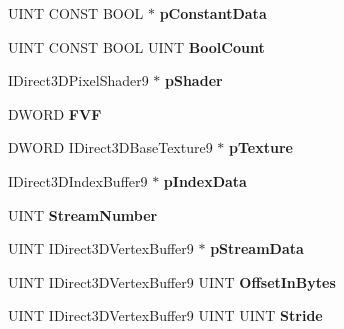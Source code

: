 \begin{DoxyCompactItemize}
U\+I\+NT C\+O\+N\+ST B\+O\+OL $\ast$ {\bfseries p\+Constant\+Data}
\item 
\mbox{\label{struct___i_direct3_d_device9_vtbl___i_n_t_a5dc90f97e64f4bf646175b102b61dd1e}} 
U\+I\+NT C\+O\+N\+ST B\+O\+OL U\+I\+NT {\bfseries Bool\+Count}
\item 
\mbox{\label{struct___i_direct3_d_device9_vtbl___i_n_t_a75d2f5b04a8408ad9ec474d1f3b1f059}} 
I\+Direct3\+D\+Pixel\+Shader9 $\ast$ {\bfseries p\+Shader}
\item 
\mbox{\label{struct___i_direct3_d_device9_vtbl___i_n_t_a95f0fdca69f68fdd3874b486af09301f}} 
D\+W\+O\+RD {\bfseries F\+VF}
\item 
\mbox{\label{struct___i_direct3_d_device9_vtbl___i_n_t_a71ba80977c9c0055ef740db4d1a2ad39}} 
D\+W\+O\+RD I\+Direct3\+D\+Base\+Texture9 $\ast$ {\bfseries p\+Texture}
\item 
\mbox{\label{struct___i_direct3_d_device9_vtbl___i_n_t_af3ca4e612c559f0b420e6454221ad424}} 
I\+Direct3\+D\+Index\+Buffer9 $\ast$ {\bfseries p\+Index\+Data}
\item 
\mbox{\label{struct___i_direct3_d_device9_vtbl___i_n_t_a1b2146d21829347806b1dc6c9877c755}} 
U\+I\+NT {\bfseries Stream\+Number}
\item 
\mbox{\label{struct___i_direct3_d_device9_vtbl___i_n_t_a8b1b8eb39695cbc180ea06d35021b788}} 
U\+I\+NT I\+Direct3\+D\+Vertex\+Buffer9 $\ast$ {\bfseries p\+Stream\+Data}
\item 
\mbox{\label{struct___i_direct3_d_device9_vtbl___i_n_t_a32f5e82faef37d687a0308f5c8a41e65}} 
U\+I\+NT I\+Direct3\+D\+Vertex\+Buffer9 U\+I\+NT {\bfseries Offset\+In\+Bytes}
\item 
\mbox{\label{struct___i_direct3_d_device9_vtbl___i_n_t_a1faf428a9874170b4c80c154f428f01d}} 
U\+I\+NT I\+Direct3\+D\+Vertex\+Buffer9 U\+I\+NT U\+I\+NT {\bfseries Stride}

\end{DoxyCompactItemize}
